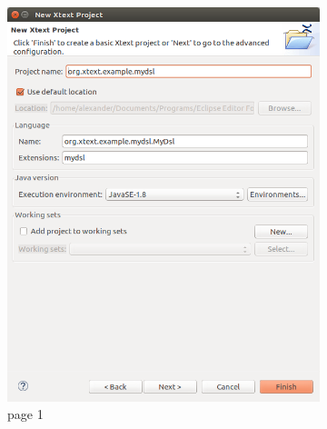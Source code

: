 \documentclass{article}
\begin{document}
\begin{figure}[t!]
  \centering
  \begin{subfigure}[b]{0.45\linewidth}
    \includegraphics[width=\linewidth]{./Screenshots/newXtextProject.png}
    \caption{page 1}
  \end{subfigure}
  \begin{subfigure}[b]{0.45\linewidth}

\end{subfigure}
\end{figure}
\end{document}
